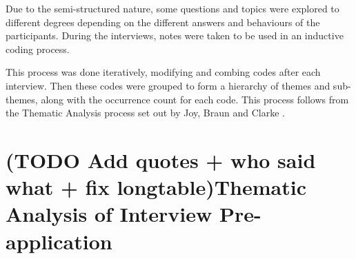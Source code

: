 Due to the semi-structured nature, some questions and topics were explored to different degrees depending on the different answers and behaviours of the participants. During the interviews, notes were taken to be used in an inductive coding process.

This process was done iteratively, modifying and combing codes after each interview. Then these codes were grouped to form a hierarchy of themes and sub-themes, along with the occurrence count for each code. This process follows from the Thematic Analysis process set out by Joy, Braun and Clarke \cite{evaluatio::thematic_analysis}.

\section{(TODO Add quotes + who said what + fix longtable)Thematic Analysis of Interview Pre-application}
